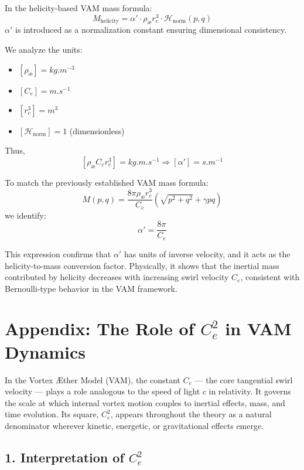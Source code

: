 \documentclass[a4paper, aps,preprint,superscriptaddress, 12pt]{revtex4}
\begin{document}
In the helicity-based VAM mass formula:
\[
    M_{\text{helicity}} = \alpha' \cdot \rho_\text{\ae} r_c^3 \cdot \mathcal{H}_{\text{norm}}(p,q)
\]
\( \alpha' \) is introduced as a normalization constant ensuring dimensional consistency.

We analyze the units:
\begin{itemize}
    \item \( [\rho_\text{\ae}] = \si{kg.m^{-3}} \)
    \item \( [C_e] = \si{m.s^{-1}} \)
    \item \( [r_c^3] = \si{m^3} \)
    \item \( [\mathcal{H}_{\text{norm}}] = 1 \) (dimensionless)
\end{itemize}
Thus,
\[
    [\rho_\text{\ae} C_e r_c^3] = \si{kg.m.s^{-1}} \Rightarrow [\alpha'] = \si{s.m^{-1}}
\]

To match the previously established VAM mass formula:
\[
    M(p, q) = \frac{8\pi \rho_\text{\ae} r_c^3}{C_e} \left( \sqrt{p^2 + q^2} + \gamma pq \right)
\]
we identify:
\[
    \boxed{\alpha' = \frac{8\pi}{C_e}}
\]

This expression confirms that \( \alpha' \) has units of inverse velocity, and it acts as the helicity-to-mass conversion factor. Physically, it shows that the inertial mass contributed by helicity decreases with increasing swirl velocity \( C_e \), consistent with Bernoulli-type behavior in the VAM framework.

\appendix

\section*{Appendix: The Role of \( C_e^2 \) in VAM Dynamics}

In the Vortex \AE{}ther Model (VAM), the constant \( C_e \) --- the core tangential swirl velocity --- plays a role analogous to the speed of light \( c \) in relativity. It governs the scale at which internal vortex motion couples to inertial effects, mass, and time evolution. Its square, \( C_e^2 \), appears throughout the theory as a natural denominator wherever kinetic, energetic, or gravitational effects emerge.

\subsection*{1. Interpretation of \( C_e^2 \)}
\end{document}
